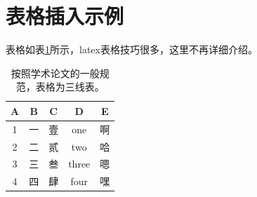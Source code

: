 \section{表格插入示例}
表格如表\ref{T.example}所示，latex表格技巧很多，这里不再详细介绍。

\begin{table}[htb]
  \centering
  \caption{按照学术论文的一般规范，表格为三线表。}
  \label{T.example}
  \begin{tabular}{ccccc}
\toprule
A   &  B  &  C  & D  & E \\
\midrule
1 	& 一 & 壹 & one 	 & 啊\\
2 	& 二 & 贰 & two 	 & 哈\\
3 	& 三 & 叁 & three & 嗯\\
4 	& 四 & 肆 & four	 & 嘿\\
\bottomrule
\end{tabular}
\end{table}